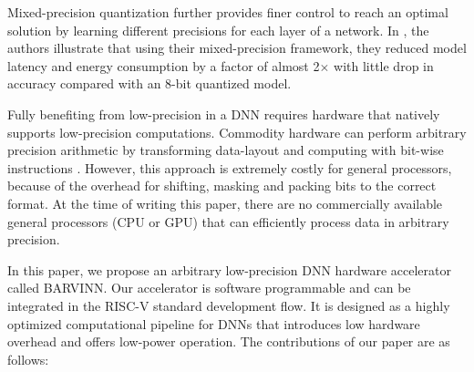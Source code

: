 \documentclass[sigconf]{acmart}
\newcommand{\BARVINN}{BARVINN}
\begin{document}
\begin{table}[]
\begin{tabular}{|l|c|l|l|c|c|}
\end{tabular}
\label{tab:lsq_quant}
\vspace{-1cm}
\end{table}

Mixed-precision quantization \cite{micikevicius2017mixed,8954415,DBLP:conf/iclr/UhlichMCYGTKN20,DBLP:conf/aaai/YuLSH021,Bulat_2021_ICCV} further provides finer control to reach an optimal solution by learning different precisions for each layer of a network. In \cite{8954415}, the authors illustrate that using their mixed-precision framework, they reduced model latency and energy consumption by a factor of almost 2$\times$ with little drop in accuracy compared with an 8-bit quantized model. 

Fully benefiting from low-precision in a DNN requires hardware that natively supports low-precision computations. Commodity hardware can  perform arbitrary precision arithmetic by transforming data-layout and computing with bit-wise instructions \cite{10.1145/3368826.3377912}. However, this approach is extremely costly for general processors, because of the overhead for shifting, masking and packing bits to the correct format. At the time of writing this paper, there are no commercially available general processors (CPU or GPU) that can efficiently process data in arbitrary precision.  

In this paper, we propose an arbitrary low-precision DNN hardware accelerator called \BARVINN{}. 
Our accelerator is software programmable and can be integrated in the RISC-V standard development flow. It is designed as a highly optimized computational pipeline for DNNs that introduces low hardware overhead and offers low-power operation.
The contributions of our paper are as follows: 
\end{document}
